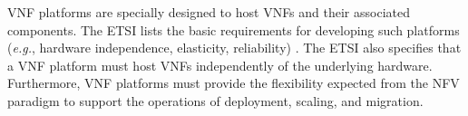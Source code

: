 
VNF platforms are specially designed to host VNFs and their associated components. The ETSI lists the basic requirements for developing such platforms (\textit{e.g.}, hardware independence, elasticity, reliability) \cite{SWA-2014}. The ETSI also specifies that a VNF platform must host VNFs independently of the underlying hardware. Furthermore, VNF platforms must provide the flexibility expected from the NFV paradigm to support the operations of deployment, scaling, and migration.






